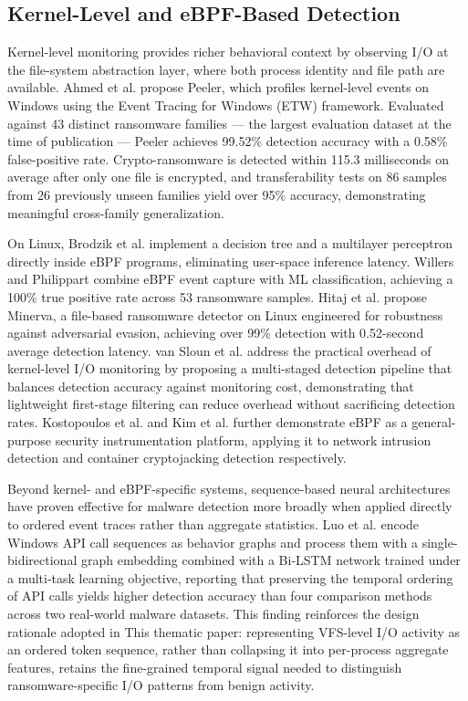 \subsection{Kernel-Level and eBPF-Based Detection}\label{sec:2.3.2}

Kernel-level monitoring provides richer behavioral context by observing I/\allowbreak{}O at the file-system abstraction layer, where both process identity and file path are available. Ahmed et al. \cite{ref14} propose Peeler, which profiles kernel-level events on Windows using the Event Tracing for Windows (ETW) framework. Evaluated against 43 distinct ransomware families --- the largest evaluation dataset at the time of publication --- Peeler achieves 99.52\% detection accuracy with a 0.58\% false-positive rate. Crypto-ransomware is detected within 115.3 milliseconds on average after only one file is encrypted, and transferability tests on 86 samples from 26 previously unseen families yield over 95\% accuracy, demonstrating meaningful cross-family generalization.

On Linux, Brodzik et al. \cite{ref13} implement a decision tree and a multilayer perceptron directly inside eBPF programs, eliminating user-space inference latency. Willers and Philippart \cite{ref17} combine eBPF event capture with ML classification, achieving a 100\% true positive rate across 53 ransomware samples. Hitaj et al. \cite{ref20} propose Minerva, a file-based ransomware detector on Linux engineered for robustness against adversarial evasion, achieving over 99\% detection with 0.52-second average detection latency. van Sloun et al. \cite{ref24} address the practical overhead of kernel-level I/\allowbreak{}O monitoring by proposing a multi-staged detection pipeline that balances detection accuracy against monitoring cost, demonstrating that lightweight first-stage filtering can reduce overhead without sacrificing detection rates. Kostopoulos et al. \cite{ref18} and Kim et al. \cite{ref19} further demonstrate eBPF as a general-purpose security instrumentation platform, applying it to network intrusion detection and container cryptojacking detection respectively.

Beyond kernel- and eBPF-specific systems, sequence-based neural architectures have proven effective for malware detection more broadly when applied directly to ordered event traces rather than aggregate statistics. Luo et al. \cite{ref32} encode Windows API call sequences as behavior graphs and process them with a single-bidirectional graph embedding combined with a Bi-LSTM network trained under a multi-task learning objective, reporting that preserving the temporal ordering of API calls yields higher detection accuracy than four comparison methods across two real-world malware datasets. This finding reinforces the design rationale adopted in This thematic paper: representing VFS-level I/\allowbreak{}O activity as an ordered token sequence, rather than collapsing it into per-process aggregate features, retains the fine-grained temporal signal needed to distinguish ransomware-specific I/\allowbreak{}O patterns from benign activity.

